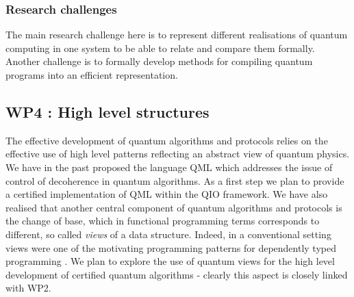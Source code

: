 \documentclass[a4paper]{article}
\begin{document}


\subsubsection*{Research challenges}

The main research challenge here is to represent different realisations
of quantum computing in one system to be able to relate and compare
them formally. Another challenge is to formally develop methods
for compiling quantum programs into an efficient representation.

\subsection*{WP4 : High level structures}
\label{sec:wp4}

The effective development of quantum algorithms and protocols relies
on the effective use of high level patterns reflecting an abstract
view of quantum physics. We have in the past proposed the language QML
which addresses the issue of control of decoherence in quantum
algorithms. As a first step we plan to provide a certified
implementation of QML within the QIO framework. We have also realised
that another central component of quantum algorithms and protocols is
the change of base, which in functional programming terms corresponds
to different, so called \emph{views} of a data structure. Indeed, in a
conventional setting views were one of the motivating programming
patterns for dependently typed programming . We plan to
explore the use of quantum views for the high level development of
certified quantum algorithms - clearly this aspect is closely linked
with WP2. 
\end{document}
